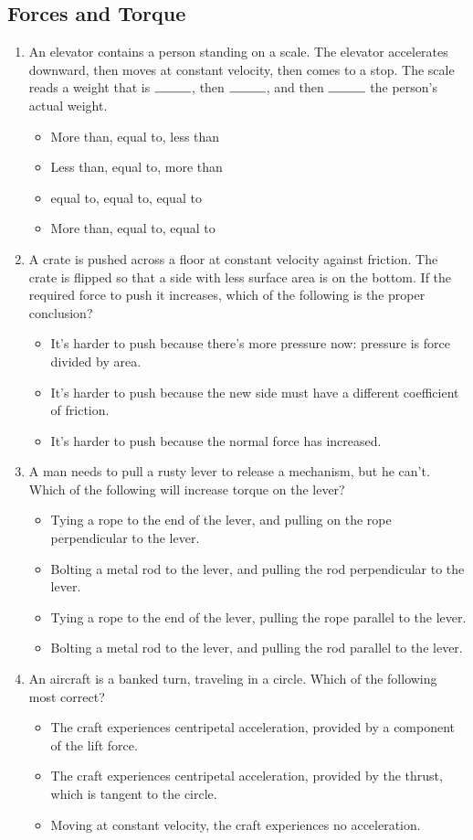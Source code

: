 \documentclass[10pt]{article}
\begin{document}
\subsection{Forces and Torque}
\begin{enumerate}
\item An elevator contains a person standing on a scale.  The elevator accelerates downward, then moves at constant velocity, then comes to a stop.  The scale reads a weight that is $\rule{1cm}{0.15mm}$, then $\rule{1cm}{0.15mm}$, and then $\rule{1cm}{0.15mm}$ the person's actual weight.
\begin{itemize}
\item More than, equal to, less than
\item Less than, equal to, more than
\item equal to, equal to, equal to
\item More than, equal to, equal to
\end{itemize}
\item A crate is pushed across a floor at constant velocity against friction.  The crate is flipped so that a side with less surface area is on the bottom.  If the required force to push it increases, which of the following is the proper conclusion?
\begin{itemize}
\item It's harder to push because there's more pressure now: pressure is force divided by area.
\item It's harder to push because the new side must have a different coefficient of friction.
\item It's harder to push because the normal force has increased.
\end{itemize}
\item A man needs to pull a rusty lever to release a mechanism, but he can't.  Which of the following will increase torque on the lever?
\begin{itemize}
\item Tying a rope to the end of the lever, and pulling on the rope perpendicular to the lever.
\item Bolting a metal rod to the lever, and pulling the rod perpendicular to the lever.
\item Tying a rope to the end of the lever, pulling the rope parallel to the lever.
\item Bolting a metal rod to the lever, and pulling the rod parallel to the lever.
\end{itemize}
\item An aircraft is a banked turn, traveling in a circle.  Which of the following most correct?
\begin{itemize}
\item The craft experiences centripetal acceleration, provided by a component of the lift force.
\item The craft experiences centripetal acceleration, provided by the thrust, which is tangent to the circle.
\item Moving at constant velocity, the craft experiences no acceleration.
\end{itemize}
\end{enumerate}
\end{document}
